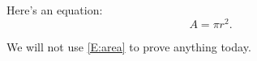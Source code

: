 \documentclass{article}
\theoremstyle{plain}
\begin{document}
Here's an equation:
\begin{equation} \label{E:area}
A = \pi r^2. \tag{$\star$}
\end{equation}

We will not use \eqref{E:area} to prove anything today.
\end{document}
